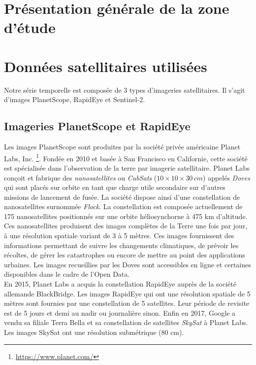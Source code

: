 \section{Présentation générale de la zone d'étude}

\section{Données satellitaires utilisées}

Notre série temporelle est composée de 3 types d’imageries satellitaires. Il s'agit d'images PlanetScope, RapidEye et Sentinel-2. 

  \subsection{Imageries PlanetScope et RapidEye}
  
Les images PlanetScope sont produites par la société privée américaine Planet Labs, Inc. \footnote{\url{https://www.planet.com/}}. Fondée en 2010 et basée à San Francisco 
en Californie, cette société est spécialisée dans l'observation de la terre par imagerie satellitaire. Planet Labs conçoit et fabrique des \emph{nanosatellites} ou \emph{CubSats} 
($10\times10\times30\,cm$) appelés \emph{Doves} qui sont placés sur orbite en tant que charge utile secondaire sur d'autres missions de lancement de fusée. La société dispose ainsi d'une
constellation de nanosatellites surnommée \emph{Flock}. La constellation est composée actuellement de 175 nanosatellites positionnés sur une orbite héliosynchorne à 475 km 
d’altitude. Ces nanosatellites produisent des images complètes de la Terre une fois par jour, à une résolution 
spatiale variant de 3 à 5 mètres. Ces images fournissent des informations permettant de suivre les changements climatiques, de prévoir les récoltes, de gérer les catastrophes ou encore de 
mettre au point des applications urbaines. Les images recueillies par les Doves sont accessibles en ligne et certaines disponibles dans le cadre de l'Open Data. \\
En 2015, Planet Labs a acquis la constellation RapidEye auprès de la société allemande BlackBridge. Les images RapidEye qui ont une résolution spatiale de 5 mètres sont fournies par une 
constellation de 5 satellites. Leur période de revisite est de 5 jours et demi au nadir ou journalière sinon. Enfin en 2017, Google a vendu sa filiale Terra Bella et sa constellation de 
satellites \emph{SkySat} à Planet Labs. Les images SkySat ont une résolution submétrique (80 cm). 

